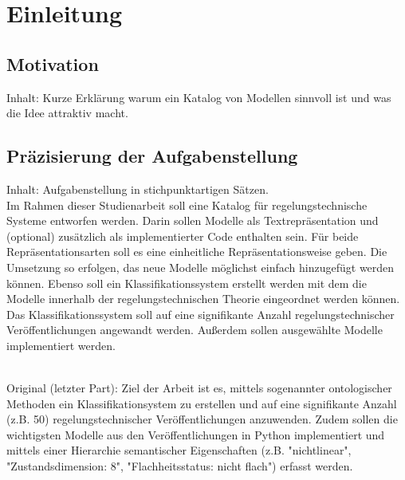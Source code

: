 \chapter{Einleitung}
\section{Motivation}
Inhalt: Kurze Erklärung warum ein Katalog von Modellen sinnvoll ist und was die Idee attraktiv macht.

\section{Präzisierung der Aufgabenstellung}
Inhalt: Aufgabenstellung in stichpunktartigen Sätzen.
\\
Im Rahmen dieser Studienarbeit soll eine Katalog für regelungstechnische Systeme entworfen werden. Darin sollen Modelle als Textrepräsentation und (optional) zusätzlich als implementierter Code enthalten sein. Für beide Repräsentationsarten soll es eine einheitliche Repräsentationsweise geben. Die Umsetzung so erfolgen, das neue Modelle möglichst einfach hinzugefügt werden können. Ebenso soll ein Klassifikationssystem erstellt werden mit dem die Modelle innerhalb der regelungstechnischen Theorie eingeordnet werden können. Das Klassifikationssystem soll auf eine signifikante Anzahl regelungstechnischer Veröffentlichungen angewandt werden. Außerdem sollen ausgewählte  Modelle implementiert werden.

\\
Original (letzter Part): Ziel der Arbeit ist es, mittels sogenannter ontologischer Methoden ein Klassifikationsystem zu erstellen und auf eine signifikante Anzahl (z.B. 50) regelungstechnischer Veröffentlichungen anzuwenden. Zudem sollen die wichtigsten Modelle aus den Veröffentlichungen in Python implementiert und mittels einer Hierarchie semantischer Eigenschaften (z.B. "nichtlinear", "Zustandsdimension: 8", "Flachheitsstatus: nicht flach") erfasst werden.